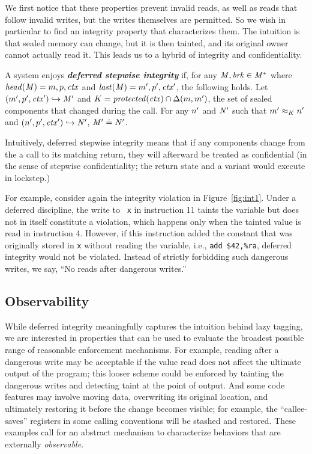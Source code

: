\documentclass[acmsmall,review,anonymous]{acmart}\settopmatter{printfolios=true,printccs=false,printacmref=false}
\begin{document}
{We first notice that these properties prevent invalid reads, as well as reads
that follow invalid writes, but the writes themselves are permitted.
So we wish in particular to find an integrity property that characterizes them.
The intuition is that sealed memory can change, but it is
then tainted, and its original owner cannot actually read it. This
leads us to a hybrid of integrity and confidentiality.

A system enjoys \textbf{\textit{deferred stepwise integrity}} if,
for any \(\mathit{M},\mathit{brk} \in \mathit{M}^*\) where \(\mathit{head}(\mathit{M}) = m,p,\mathit{ctx}\) and
\(\mathit{last}(\mathit{M}) = m',p',\mathit{ctx}'\), the following holds. Let
\((m',p',\mathit{ctx}') \hookrightarrow \mathit{M}'\) and
\(K = \mathit{protected}(\mathit{ctx}) \cap \Delta(m,m')\), the
set of sealed components that changed during the call.
For any \(n'\) and \(\mathit{N}'\) such that \(m' \approx_{K} n'\) and
\((n',p',\mathit{ctx}') \hookrightarrow \mathit{N}'\), \(\mathit{M}' \doteq \mathit{N}'\).

Intuitively, deferred stepwise integrity means that if any components change from
the a call to its matching return, they will afterward be treated as confidential
(in the sense of stepwise confidentiality; the return state and a variant would
execute in lockstep.)

For example, consider again the integrity violation in
Figure~\ref{fig:int1}. Under a deferred discipline, the write to {\tt
  x} in instruction 11 taints the variable but does not in itself
constitute a violation, which happens only when the tainted value is
read in instruction 4. However, if this instruction added the constant
that was originally stored in {\tt x} without reading the variable,
i.e., {\tt add \$42,\%ra}, deferred integrity would not be violated.
Instead of strictly forbidding such dangerous writes, we say,
``No reads after dangerous writes.''

\subsection{Observability}

While deferred integrity meaningfully captures the intuition
behind lazy tagging, we are interested in properties that can be used to
evaluate the broadest possible range of reasonable
enforcement mechanisms.
For example, reading after a dangerous write may be acceptable if the value
read does not affect the ultimate output of the program; this looser scheme
could be enforced by tainting the dangerous writes and detecting taint
at the point of output.
And some code features may involve moving data, overwriting its original location,
and ultimately restoring it before the change becomes visible; for example, the
``callee-saves'' registers in some calling conventions will be stashed and restored.
These examples call for an abstract mechanism to characterize behaviors that are externally
\emph{observable}.

}
\end{document}
